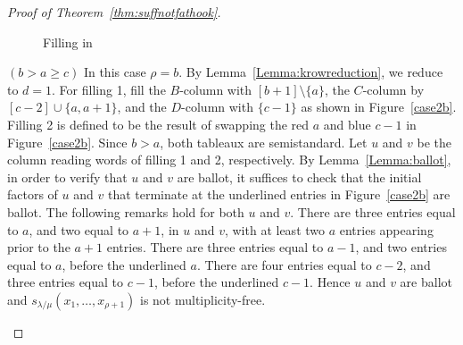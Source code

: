 \begin{proof}[Proof of Theorem~\ref{thm:suffnotfathook}]
\begin{Case}
\begin{figure}[htb]
 \caption[Filling in Case 2.1]{Filling in }
 \label{case2a}
\end{figure}

\end{Case}

\begin{Case}
{ $(b>a\geq c)$} 
In this case $\rho=b$. By Lemma~\ref{Lemma:krowreduction}, we reduce to $d=1$. For filling 1, fill the $B$-column with $[b+1]\setminus\{a\}$, the $C$-column by $[c-2]\cup\{a,a+1\}$, and the $D$-column with $\{c-1\}$ as shown in Figure~\ref{case2b}. Filling 2 is defined to be the result of swapping the red $a$ and blue $c-1$ in Figure~\ref{case2b}. Since $b>a$, both tableaux are semistandard. Let $u$ and $v$ be the column reading words of filling 1 and 2, respectively. By Lemma~\ref{Lemma:ballot}, in order to verify that $u$ and $v$ are ballot, it suffices to check that the initial factors of $u$ and $v$ that terminate at the underlined entries in Figure~\ref{case2b} are ballot. The following remarks hold for both $u$ and $v$. There are three entries equal to $a$, and two equal to $a+1$, in $u$ and $v$, with at least two $a$ entries appearing prior to the $a+1$ entries. There are three entries equal to $a-1$, and two entries equal to $a$, before the underlined $a$. There are four entries equal to $c-2$, and three entries equal to $c-1$, before the underlined $c-1$. Hence $u$ and $v$ are ballot and $s_{\lambda/\mu}(x_1,\ldots,x_{\rho+1})$ is not multiplicity-free.

\begin{figure}[htb]\centering
\end{figure}
\end{Case}
\end{proof}
